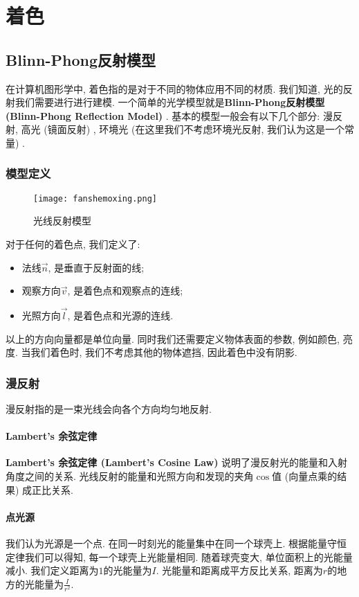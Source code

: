 
\part{着色}

\chapter{Blinn-Phong反射模型}
在计算机图形学中, 着色指的是对于不同的物体应用不同的材质. 我们知道, 光的反射我们需要进行进行建模. 一个简单的光学模型就是\textbf{Blinn-Phong反射模型 (Blinn-Phong Reflection Model) }. 基本的模型一般会有以下几个部分: 漫反射, 高光 (镜面反射) , 环境光 (在这里我们不考虑环境光反射, 我们认为这是一个常量) . 

\section{模型定义}
\begin{figure}[H]
	\centering
	\texttt{[image: fanshemoxing.png]}
	\caption{光线反射模型}
	\label{fig:fanshe}
\end{figure}
对于任何的着色点, 我们定义了: 
\begin{itemize}
	\item 法线$\overrightarrow{n}$, 是垂直于反射面的线; 
	\item 观察方向$\overrightarrow{v}$, 是着色点和观察点的连线; 
	\item 光照方向$\overrightarrow{l}$, 是着色点和光源的连线. 
\end{itemize}
以上的方向向量都是单位向量. 同时我们还需要定义物体表面的参数, 例如颜色, 亮度. 当我们着色时, 我们不考虑其他的物体遮挡, 因此着色中没有阴影. 

\section{漫反射}
漫反射指的是一束光线会向各个方向均匀地反射. 

\subsection{Lambert's 余弦定律}
\textbf{Lambert's 余弦定律 (Lambert's Cosine Law) }说明了漫反射光的能量和入射角度之间的关系. 光线反射的能量和光照方向和发现的夹角$\cos$值 (向量点乘的结果) 成正比关系. 

\subsection{点光源}
我们认为光源是一个点. 在同一时刻光的能量集中在同一个球壳上. 根据能量守恒定律我们可以得知, 每一个球壳上光能量相同. 随着球壳变大, 单位面积上的光能量减小. 我们定义距离为$1$的光能量为$I$. 光能量和距离成平方反比关系, 距离为$r$的地方的光能量为$\frac{I}{r^2}$.

